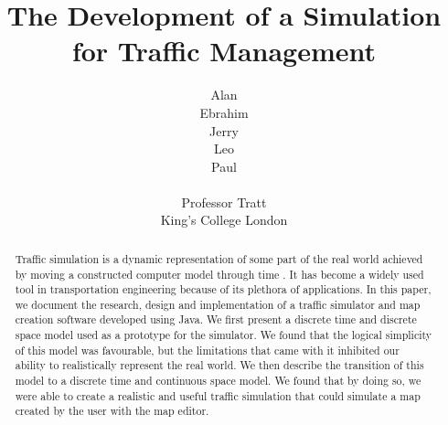 \documentclass[11pt,a4paper]{article}
\begin{document}
\title{The Development of a Simulation for Traffic Management}
\author{Alan\\Ebrahim\\Jerry\\Leo\\Paul\\\\
Professor Tratt\\King's College London}
\maketitle
\begin{abstract}
Traffic simulation is a dynamic representation of some part of the real world achieved by moving a constructed computer model through time \cite{drew1968traffic}. It has become a widely used tool in transportation engineering because of its plethora of applications. In this paper, we document the research, design and implementation of a traffic simulator and  map creation software developed using Java. We first present a discrete time and discrete space model used as a prototype for the simulator. We found that the logical simplicity of this model was favourable, but the limitations that came with it inhibited our ability to realistically represent the real world. We then describe the transition of this model to a discrete time and continuous space model. We found that by doing so, we were able to create a realistic and useful traffic simulation that could simulate a map created by the user with the map editor.
\end{abstract}
\clearpage
\begin{tableofcontents}
\end{tableofcontents}
\clearpage
	
	
	
	
	
	
	

	\fancyfoot[C]{\thepage}
	
	
	
	\appendix
	

	\pagestyle{empty}
		
	
\end{document}
